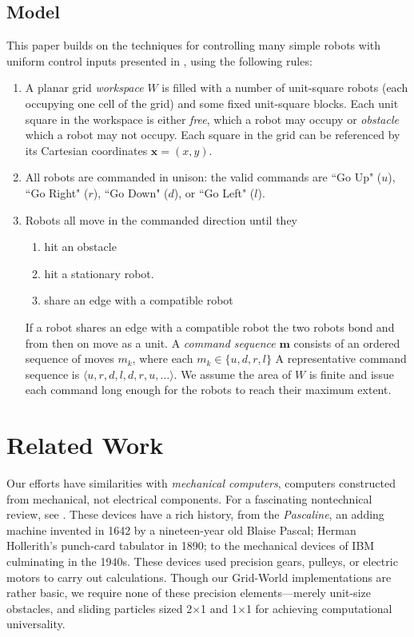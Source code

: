 \documentclass[letterpaper, 10 pt, conference]{ieeeconf}
\begin{document}
 \subsection{Model}
  
This paper builds on the techniques for controlling many simple robots with uniform control inputs presented in \cite{Becker2013f,Becker2014,Becker2014a}, using the following rules:
\begin{enumerate}
\item A planar  grid \emph{workspace} $W$ is filled with a number of unit-square robots (each occupying one cell of the grid)  and some fixed unit-square blocks.  Each unit square in the workspace is either  \emph{free}, which a robot may occupy or \emph{obstacle} which a robot may not occupy.  Each square in the grid can be referenced by its Cartesian coordinates $\bm{x}=(x,y)$.
\item All robots are commanded in unison: the valid commands are  ``Go Up" ($u$), ``Go Right" ($r$), ``Go Down" ($d$), or ``Go Left" ($l$).  
\item Robots all move in the commanded direction until they 
	\begin{enumerate}
		\item hit an obstacle 
		\item hit a stationary robot. 
		\item share an edge with a compatible robot
	\end{enumerate}
	If a robot shares an edge with a compatible robot the two robots bond and from then on move as a unit.
A \emph{command sequence} $\bm{m}$ consists of an ordered sequence of moves $m_k$, where each $m_k\in\{u,d,r,l\}$  A representative command sequence is $\langle u,r,d,l,d,r,u,\ldots\rangle$. We assume the area of $W$ is finite and issue each command long enough for the robots to reach their maximum extent.
\end{enumerate}



\section{Related Work}\label{sec:RelatedWork}
Our efforts have similarities with \emph{mechanical computers},  computers
constructed from mechanical, not electrical components. For a fascinating
nontechnical review, see \cite{McCourtney1999}.  These devices have a rich
history, from the \emph{Pascaline}, an adding machine invented in 1642 by a
nineteen-year old Blaise Pascal; Herman Hollerith's punch-card tabulator in
1890; to the mechanical devices of IBM culminating in the 1940s.  These devices
used precision gears, pulleys, or electric motors to carry out calculations.
Though our {\sc Grid-World} implementations are rather basic, 
we require none of these precision elements---merely unit-size obstacles,  and
sliding particles sized 2$\times$1 and 1$\times$1 for achieving computational universality.
\end{document}
